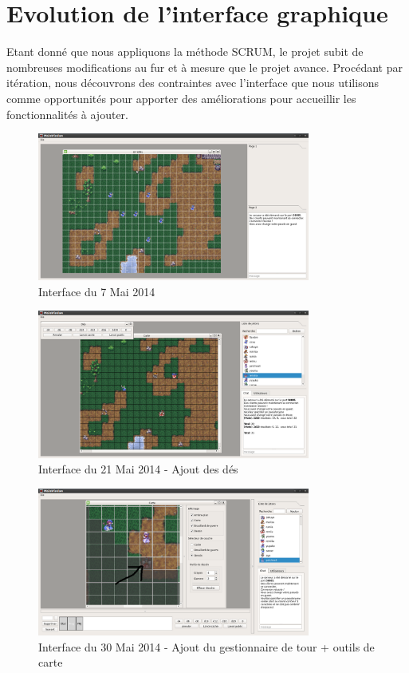 \section{Evolution de l'interface graphique}

Etant donné que nous appliquons la méthode SCRUM, le projet subit de nombreuses modifications au fur et à mesure que le projet avance. Procédant par itération, nous découvrons des contraintes avec l'interface que nous utilisons comme opportunités pour apporter des améliorations pour accueillir les fonctionnalités à ajouter. 

\begin{figure}[h!]
	\centering
	\includegraphics[width=0.8\textwidth]{img/gui_history/2014_05_07_screen.png}
	\caption{Interface du 7 Mai 2014}
\end{figure}

\begin{figure}[h!]
	\centering
	\includegraphics[width=0.8\textwidth]{img/gui_history/2014_05_21_screen.png}
	\caption{Interface du 21 Mai 2014 - Ajout des dés}
\end{figure}
\newpage

\begin{figure}[h!]
	\centering
	\includegraphics[width=0.8\textwidth]{img/gui_history/2014_05_30_screen.png}
	\caption{Interface du 30 Mai 2014 - Ajout du gestionnaire de tour + outils de carte}
\end{figure}

